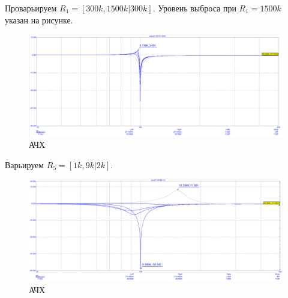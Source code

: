 \documentclass[12pt,a4paper]{article}
\begin{document}
	Проварьируем $R_1 = [300k, 1500k|300k]$.
	Уровень выброса при $R_1 = 1500k$ указан на рисунке.
	\begin{figure}[H]
		\centering
		\includegraphics[width=1.0\linewidth]{res/stop2T_R1_300_1500.png}
		\caption{АЧХ}
		\label{scheme}
	\end{figure}
	
	Варьируем $R_5 = [1k, 9k | 2k]$.
	\begin{figure}[H]
		\centering
		\includegraphics[width=1.0\linewidth]{res/stop2T_R5.png}
		\caption{АЧХ}
		\label{scheme}
	\end{figure}
\end{document}
